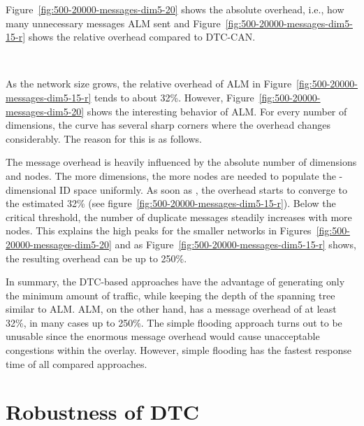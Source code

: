 \documentclass[fleqn,12pt,twoside]{article}
\begin{document}
Figure~\ref{fig:500-20000-messages-dim5-20} shows the absolute
overhead, i.e., how many unnecessary messages ALM sent and
Figure~\ref{fig:500-20000-messages-dim5-15-r} shows the relative
overhead compared to DTC-CAN.



\begin{figure*}[!tb]
  \centering
  \mbox{
    \quad
    }
\end{figure*}



As the network size grows, the relative overhead of ALM in
Figure~\ref{fig:500-20000-messages-dim5-15-r} tends to about
32\%. However, Figure~\ref{fig:500-20000-messages-dim5-20} shows the
interesting behavior of ALM. For every number of dimensions, the curve
has several sharp corners where the overhead changes considerably. The
reason for this is as follows. 

The message overhead is heavily influenced by the absolute number of
dimensions and nodes. The more dimensions, the more nodes are needed
to populate the -dimensional ID space uniformly. As soon as
, the overhead starts to converge to the estimated
32\% (see figure~\ref{fig:500-20000-messages-dim5-15-r}). Below the
critical threshold, the number of duplicate messages steadily
increases with more nodes. This explains the high peaks for the
smaller networks in Figures~\ref{fig:500-20000-messages-dim5-20} and
as Figure~\ref{fig:500-20000-messages-dim5-15-r} shows, the resulting
overhead can be up to 250\%.

In summary, the DTC-based approaches have the advantage of generating
only the minimum amount of traffic, while keeping the depth of the
spanning tree similar to ALM. ALM, on the other hand, has a message
overhead of at least 32\%, in many cases up to 250\%. The simple
flooding approach turns out to be unusable since the enormous message
overhead would cause unacceptable congestions within the overlay.
However, simple flooding has the fastest response time of all compared
approaches.


\section{Robustness of DTC}
\label{sec:robustness-security}
\end{document}

